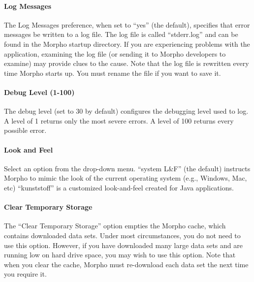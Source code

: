 \paragraph{Log Messages} The Log Messages preference, when set to ``yes'' (the
default), specifies that error messages be written to a log file. The
log file is called ``stderr.log'' and can be found in the Morpho startup
directory. If you are experiencing problems with the application,
examining the log file (or sending it to Morpho developers to examine)
may provide clues to the cause. Note that the log file is rewritten
every time Morpho starts up. You must rename the file if you want to
save it.

\paragraph{Debug Level (1-100)} The debug level (set to 30 by default)
configures the debugging level used to log. A level of 1 returns only
the most severe errors. A level of 100 returns every possible error.

\paragraph{Look and Feel} Select an option from the drop-down menu.
``system L\&F'' (the default) instructs Morpho to mimic the look of the
current operating system (e.g., Windows, Mac, etc) ``kunststoff'' is a
customized look-and-feel created for Java applications.

\paragraph{Clear Temporary Storage} The ``Clear Temporary Storage''
option empties the Morpho cache, which contains downloaded data sets.
Under most circumstances, you do not need to use this option. However,
if you have downloaded many large data sets and are running low on hard
drive space, you may wish to use this option. Note that when you clear
the cache, Morpho must re-download each data set the next time you
require it.
